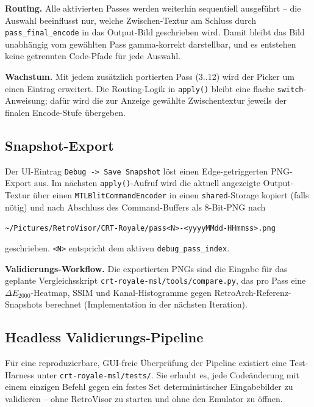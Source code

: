 \documentclass[11pt, a4paper]{article}
\begin{document}
\vspace{.25cm}
\textbf{Routing.} Alle aktivierten Passes werden weiterhin sequentiell ausgef\"uhrt -- die Auswahl beeinflusst nur, welche Zwischen-Textur am Schluss durch \texttt{pass\_final\_encode} in das Output-Bild geschrieben wird. Damit bleibt das Bild unabh\"angig vom gew\"ahlten Pass gamma-korrekt darstellbar, und es entstehen keine getrennten Code-Pfade f\"ur jede Auswahl.

\vspace{.25cm}
\textbf{Wachstum.} Mit jedem zus\"atzlich portierten Pass (3..12) wird der Picker um einen Eintrag erweitert. Die Routing-Logik in \texttt{apply()} bleibt eine flache \texttt{switch}-Anweisung; daf\"ur wird die zur Anzeige gew\"ahlte Zwischentextur jeweils der finalen Encode-Stufe \"ubergeben.

\vspace{.5cm}
\subsection{Snapshot-Export}
\vspace{.5cm}
Der UI-Eintrag \texttt{Debug -> Save Snapshot} l\"ost einen Edge-getriggerten PNG-Export aus. Im n\"achsten \texttt{apply()}-Aufruf wird die aktuell angezeigte Output-Textur \"uber einen \texttt{MTLBlitCommandEncoder} in einen \texttt{shared}-Storage kopiert (falls n\"otig) und nach Abschluss des Command-Buffers als 8-Bit-PNG nach
\begin{center}
    \texttt{\textasciitilde/Pictures/RetroVisor/CRT-Royale/pass<N>-<yyyyMMdd-HHmmss>.png}
\end{center}
geschrieben. \texttt{<N>} entspricht dem aktiven \texttt{debug\_pass\_index}.

\vspace{.25cm}
\textbf{Validierungs-Workflow.} Die exportierten PNGs sind die Eingabe f\"ur das geplante Vergleichsskript \texttt{crt-royale-msl/tools/compare.py}, das pro Pass eine $\Delta E_{2000}$-Heatmap, SSIM und Kanal-Histogramme gegen RetroArch-Referenz-Snapshots berechnet (Implementation in der n\"achsten Iteration).

\vspace{.5cm}
\subsection{Headless Validierungs-Pipeline}
\vspace{.5cm}
F\"ur eine reproduzierbare, GUI-freie \"Uberpr\"ufung der Pipeline existiert eine Test-Harness unter \texttt{crt-royale-msl/tests/}. Sie erlaubt es, jede Code\"anderung mit einem einzigen Befehl gegen ein festes Set deterministischer Eingabebilder zu validieren -- ohne RetroVisor zu starten und ohne den Emulator zu \"offnen.
\end{document}
